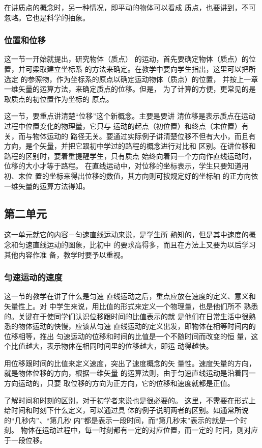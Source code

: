 在讲质点的概念时，另一种情况，即平动的物体可以看成
质点，也要讲到，不可忽略。它也是科学的抽象。

\subsubsection{位置和位移}
 这一节一开始就提出，研究物体（质点）
的运动，首先要确定物体（质点）的位置，并可梁取建立坐标系
的方法来确定。在教学中要向学生指出，这里可以把所选定
的参照物，作为坐标系的原点以确定运动物体（质点）的位置，
并按上一章一维矢量的运算方法，来确定质点的位移。但是，
为了计算的方便，更常见的是取质点的初位置作为坐标的
原点。

这一节，要重点讲清楚“位移”这个新概念。主要是要讲
清位移是表示质点在运动过程中位置变化的物理量，它只与
运动的起点（初位置）和终点（末位置）有关，而与物体运动的
路径无关。要通过实际例子讲清楚位移不但有大小，而且有
方向，是个矢量，并把它跟初中学过的路程的概念进行对比和
区别。在讲位移和路程的区别时，要着重提醒学生，只有质点
始终向着同一个方向作直线运动时，位移的大小才等于路程。
在直线运动中，对位移的坐标表示，学生只要知道用初、末位
置的坐标来得出位移的数值，其方向则可按规定好的坐标轴
的正方向依一维矢量的运算方法得知。

\subsection{第二单元}
这一单元就它的内容－匀速直线运动来说，是学生所
熟知的，但是其中速度的概念和匀速直线运动的图象，比初中
的要求高得多，而且在方法上又要为以后学习其他内容作准
备，教学时要予以重视。

\subsubsection{匀速运动的速度}

这一节的教学在讲了什么是匀速
直线运动之后，重点应放在速度的定义、意义和矢量性上。对
中学生来说，用比值的形式来定义一个物理量，也是他们所不
熟悉的。关键在于使同学们认识位移跟时间的比值表示的就
是他们在日常生活中很熟悉的物体运动的快慢，应该从匀速
直线运动的定义出发，即物体在相等时间内的位移相等，推出
匀速运动的位移和时间的比值是一个不随时间而改变的恒
量，这个比值越大，表示物体在相同时间里的位移越大，即运
动得越快。

用位移跟时间的比值来定义速度，突出了速度概念的矢
量性。速度矢量的方向，就是物体位移的方向，根据一维矢量
的运算法则，由于匀速直线运动是沿着同一方向运动的，只要
取位移的方向为正方向，它的位移和速度就都是正值。

了解时间和时刻的区别，对于初学者来说也是很必要的。
这里，不需要在形式上给时间和时刻下什么定义，可以通过具
体的例子说明两者的区别。如通常所说的“几秒内”、“第几秒
内”都是表示一段时间，而“第几秒末”表示的就是一个时刻。
物体在运动过程中，每一时刻都有一定的对应位置，而一定的
时间，则对应于一段位移。

